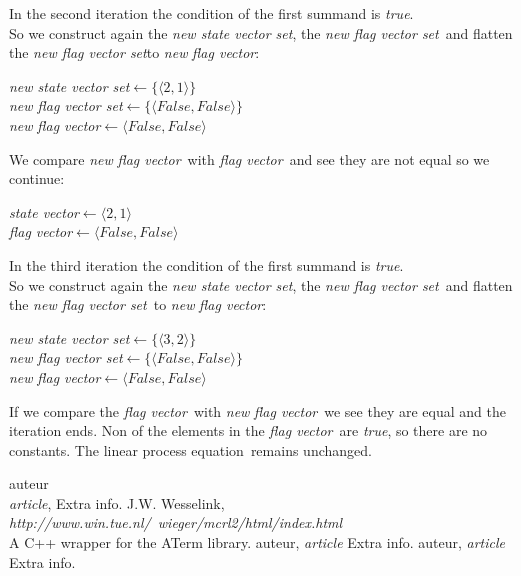 \documentclass[a4paper,10pt]{article}
\newcommand{\lpe}{linear process equation}
\newcommand{\ti}{\textit}
\newcommand{\sv}{\textit{state vector}}
\newcommand{\fv}{\textit{flag vector}}
\newcommand{\svs}{\textit{new state vector set}}
\newcommand{\fvs}{\textit{new flag vector set}}
\newcommand{\la}{$\leftarrow$}
\begin{document}
In the second iteration the condition of the first summand is \ti{true}.\\
So we construct again the \svs, the \fvs\ and flatten the \fvs to \ti{new} \fv: 
\begin{center}\begin{minipage}{250pt}
\svs \la  $\lbrace \langle 2 , 1 \rangle \rbrace $\\
\fvs \la  $\lbrace \langle False , False \rangle \rbrace $\\
\ti{new} \fv \la  $\langle False , False \rangle $ \\
\end{minipage}\end{center}

We compare \ti{new} \fv\ with \fv\ and see they are not equal so we continue:
\begin{center}\begin{minipage}{250pt}
\sv \la $\langle 2 , 1 \rangle $\\
\fv \la $\langle False , False \rangle $\\
\end{minipage}\end{center}

In the third iteration the condition of the first summand is \ti{true}.\\
So we construct again the \svs, the \fvs\ and flatten the \fvs\ to \ti{new} \fv: 
\begin{center}\begin{minipage}{250pt}
\svs \la  $\lbrace \langle 3 , 2 \rangle \rbrace $\\
\fvs \la  $\lbrace \langle False , False \rangle \rbrace $\\
\ti{new} \fv \la  $\langle False , False \rangle $ \\
\end{minipage}\end{center}

If we compare the \fv\ with \ti{new} \fv\ we see they are equal and the iteration ends.
Non of the elements in the \fv\ are \ti{true}, so there are no constants. The \lpe\ remains unchanged.


\newpage
\begin{thebibliography}{99}   auteur\\
   \textit{article},
   Extra info.
   J.W. Wesselink,
   \textit{http://www.win.tue.nl/~wieger/mcrl2/html/index.html}\\
   A C++ wrapper for the ATerm library.
   auteur,
   \textit{article}
   Extra info.
   auteur,
   \textit{article}
   Extra info.

\end{thebibliography}
\end{document}
